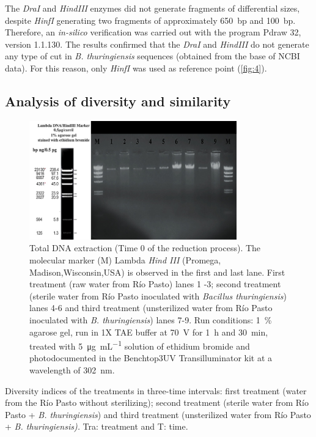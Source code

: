 \documentclass{univsciauth}
\begin{document}
The \emph{DraI} and \emph{HindIII} enzymes did not generate
fragments of differential sizes, despite \emph{HinfI} generating two
fragments of approximately \SI{650}{bp} and \SI{100}{bp}. Therefore, an
\emph{in-silico} verification was carried out with the program Pdraw 32,
version 1.1.130. The results confirmed that the \emph{DraI} and
\emph{HindIII} do not generate any type of cut in \emph{B.
thuringiensis} sequences (obtained from the base of NCBI data). For this
reason, only \emph{HinfI} was used as reference point (\autoref{fig:4}).

\subsection{Analysis of diversity and similarity}
\begin{figure}[t!]
        \centering
        \includegraphics[width=0.8\textwidth]{figures/Figure1.jpg}
        \caption{
                Total DNA extraction (Time 0 of the reduction
                process). The molecular marker (M) Lambda \emph{Hind III}
                (Promega, Madison,Wisconsin,USA) is observed in the first and
                last lane.  First treatment (raw water from Río Pasto) lanes 1
                -3; second treatment (sterile water from Río Pasto inoculated
                with \emph{Bacillus thuringiensis}) lanes 4-6 and third
                treatment (unsterilized water from Río Pasto inoculated with
                \emph{B. thuringiensis}) lanes 7-9. Run conditions: \SI{1}{\%}
                agarose gel, run in 1X TAE buffer at \SI{70}{V} for \SI{1}{h} and
                \SI{30}{min}, treated with \SI{5}{\micro g.mL^{-1}} solution of ethidium bromide and
                photodocumented in the Benchtop3UV Transilluminator kit at a
                wavelength of \SI{302}{nm}.
        }
        \label{fig:1}
\end{figure}
\begin{table}[b!]
        \centering
        \caption{
                Diversity indices of the treatments in three-time intervals:
                first treatment (water from the Río Pasto without sterilizing);
                second treatment (sterile water from Río Pasto + \emph{B.
                thuringiensis}) and third treatment (unsterilized water from
                Río Pasto + \emph{B. thuringiensis).} Tra: treatment and T:
                time.
        }\label{tab:2}
        
\end{table}
\end{document}
